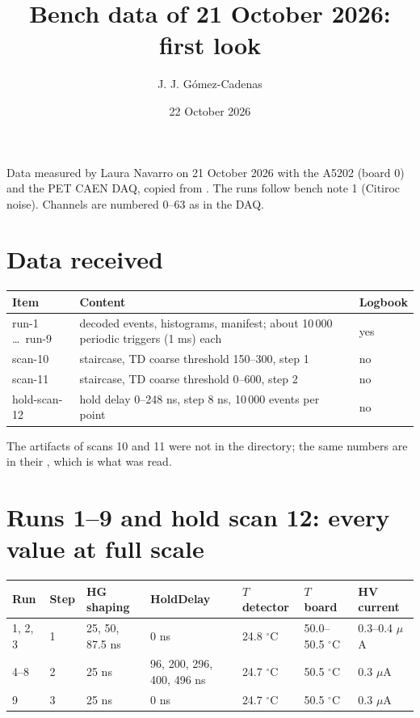 \documentclass[11pt,a4paper]{article}
\title{Bench data of 21 October 2026: first look}
\author{J. J. G\'omez-Cadenas}
\date{22 October 2026}
\begin{document}
\maketitle

Data measured by Laura Navarro on 21 October 2026 with the A5202 (board 0) and the PET CAEN
DAQ, copied from . The runs follow
bench note 1 (Citiroc noise). Channels are numbered 0--63 as in the DAQ.

\section{Data received}

\begin{center}
\small
\begin{tabular}{lp{}l}
\toprule
Item & Content & Logbook \\
\midrule
run-1 \ldots\ run-9 & decoded events, histograms, manifest; about 10\,000 periodic triggers (1 ms) each & yes \\
scan-10 & staircase, TD coarse threshold 150--300, step 1 & no \\
scan-11 & staircase, TD coarse threshold 0--600, step 2 & no \\
hold-scan-12 & hold delay 0--248 ns, step 8 ns, 10\,000 events per point & no \\
\bottomrule
\end{tabular}
\end{center}

\noindent The  artifacts of scans 10 and 11 were not in the directory; the
same numbers are in their , which is what was read.

\section{Runs 1--9 and hold scan 12: every value at full scale}

\begin{center}
\small
\begin{tabular}{lllllll}
\toprule
Run & Step & HG shaping & HoldDelay & $T$ detector & $T$ board & HV current \\
\midrule
1, 2, 3 & 1 & 25, 50, 87.5 ns & 0 ns & 24.8 $^\circ$C & 50.0--50.5 $^\circ$C & 0.3--0.4 $\mu$A \\
4--8 & 2 & 25 ns & 96, 200, 296, 400, 496 ns & 24.7 $^\circ$C & 50.5 $^\circ$C & 0.3 $\mu$A \\
9 & 3 & 25 ns & 0 ns & 24.7 $^\circ$C & 50.5 $^\circ$C & 0.3 $\mu$A \\
\bottomrule
\end{tabular}
\end{center}
\end{document}
